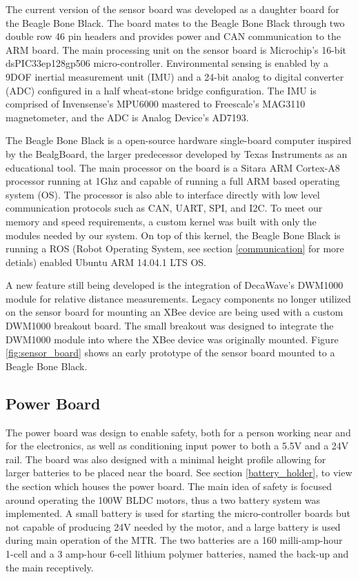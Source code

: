 The current version of the sensor board was developed as a daughter board for the Beagle Bone Black.
The board mates to the Beagle Bone Black through two double row 46 pin headers and provides power and CAN communication to the ARM board.
The main processing unit on the sensor board is Microchip's 16-bit dsPIC33ep128gp506 micro-controller.
Environmental sensing is enabled by a 9DOF inertial measurement unit (IMU) and a 24-bit analog to digital converter (ADC) configured in a half wheat-stone bridge configuration.
The IMU is comprised of Invensense's MPU6000 mastered to Freescale's MAG3110 magnetometer, and the ADC is Analog Device's AD7193.

The Beagle Bone Black is a open-source hardware single-board computer inspired by the BealgBoard, the larger predecessor developed by Texas Instruments as an educational tool.
The main processor on the board is a Sitara ARM Cortex-A8 processor running at 1Ghz and capable of running a full ARM based operating system (OS).
The processor is also able to interface directly with low level communication protocols such as CAN, UART, SPI, and I2C.
To meet our memory and speed requirements, a custom kernel was built with only the modules needed by our system.
On top of this kernel, the Beagle Bone Black is running a ROS (Robot Operating System, see section \ref{communication} for more detials) enabled Ubuntu ARM 14.04.1 LTS OS.

A new feature still being developed is the integration of DecaWave's DWM1000 module for relative distance measurements.
Legacy components no longer utilized on the sensor board for mounting an XBee device are being used with a custom DWM1000 breakout board.
The small breakout was designed to integrate the DWM1000 module into where the XBee device was originally mounted.
Figure \ref{fig:sensor_board} shows an early prototype of the sensor board mounted to a Beagle Bone Black.

\subsection{Power Board}
\label{power_board}
The power board was design to enable safety, both for a person working near \SB{} and for the electronics, as well as conditioning input power to both a 5.5V and a 24V rail.
The board was also designed with a minimal height profile allowing for larger batteries to be placed near the board.
See section \ref{battery_holder}, to view the section which houses the power board.
The main idea of safety is focused around operating the 100W BLDC motors, thus a two battery system was implemented.
A small battery is used for starting the micro-controller boards but not capable of producing 24V needed by the motor, and a large battery is used during main operation of the MTR.
The two batteries are a 160 milli-amp-hour 1-cell and a 3 amp-hour 6-cell lithium polymer batteries, named the back-up and the main receptively.

